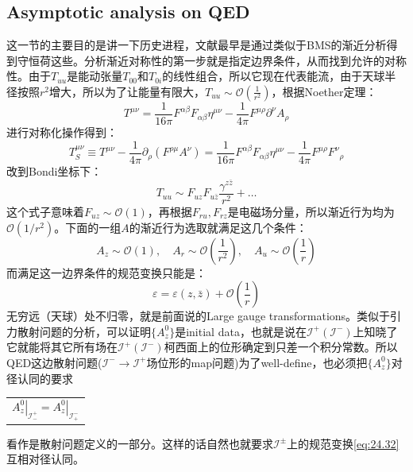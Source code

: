 \subsection{Asymptotic analysis on QED}
这一节的主要目的是讲一下历史进程，文献最早是通过类似于BMS的渐近分析得到守恒荷这些\cite{Strominger:2013lka,He:2014cra}。分析渐近对称性的第一步就是指定边界条件，从而找到允许的对称性。由于$T_{uu}$是能动张量$T_{00}$和$T_{0i}$的线性组合，所以它现在代表能流，由于天球半径按照$r^2$增大，所以为了让能量有限大，$T_{uu}\sim\mathcal{O}\left(\frac{1}{r^2}\right)$，根据Noether定理：
\begin{equation}
	T^{\mu\nu}=\frac{1}{16\pi}F^{\alpha\beta}F_{\alpha\beta}\eta^{\mu\nu}-\frac{1}{4\pi}F^{\mu\rho}\partial^{\nu}A_{\rho}
\end{equation}
进行对称化操作得到：
\begin{equation}
	T_{S}^{\mu\nu}\equiv T^{\mu\nu}-\frac{1}{4\pi}\partial_{\rho}\left(F^{\rho\mu}A^{\nu}\right)=\frac{1}{16\pi}F^{\alpha\beta}F_{\alpha\beta}\eta^{\mu\nu}-\frac{1}{4\pi}F^{\mu\rho}{F^{\nu}}_{\rho}
\end{equation}
改到Bondi坐标下：
\begin{equation}
	T_{uu}\sim F_{uz}F_{u\bar{z}}\frac{\gamma^{z\bar{z}}}{r^2}+\ldots 
\end{equation}
这个式子意味着$F_{uz}\sim\mathcal{O}(1)$，再根据$F_{ru},F_{rz}$是电磁场分量，所以渐近行为均为$\mathcal{O}(1/r^2)$。下面的一组$A$的渐近行为选取就满足这几个条件：
\begin{equation}
	A_z\sim\mathcal{O}(1),\quad A_r\sim\mathcal{O}\left(\frac{1}{r^2}\right),\quad A_u\sim\mathcal{O}\left(\frac{1}{r}\right)
\end{equation}
而满足这一边界条件的规范变换只能是：
\begin{equation}\label{eq:24.32}
	\varepsilon=\varepsilon(z,\bar{z})+\mathcal{O}\left(\frac1r\right)
\end{equation}
无穷远（天球）处不归零，就是前面说的Large gauge transformations。类似于引力散射问题的分析，可以证明$\{A^0_z\}$是initial data，也就是说在$\mathcal{I}^+(\mathcal{I}^-)$上知晓了它就能将其它所有场在$\mathcal{I}^+(\mathcal{I}^-)$柯西面上的位形确定到只差一个积分常数。所以QED这边散射问题($\mathcal{I}^-\to\mathcal{I}^+$场位形的map问题)为了well-define，也必须把$\{A^0_z\}$对径认同的要求\begin{margintable}\footnotesize 
	\begin{tabularx}{\marginparwidth}{|X}
		$$\left.A^0_z\right|_{\mathcal{I}^+_-}=\left.A^0_z\right|_{\mathcal{I}^-_+}$$
	\end{tabularx}
\end{margintable}看作是散射问题定义的一部分。这样的话自然也就要求$\mathcal{I}^\pm$上的规范变换\ref{eq:24.32}互相对径认同。

